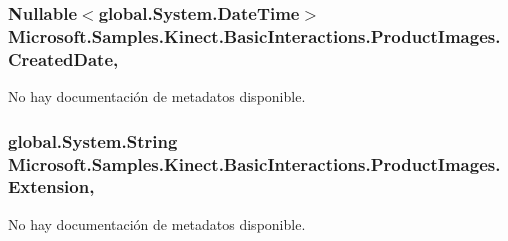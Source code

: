 \hypertarget{class_microsoft_1_1_samples_1_1_kinect_1_1_basic_interactions_1_1_product_images_a3289216b263b856ebdd7d63896f7768c}{
\subsubsection[{Created\-Date}]{\setlength{\rightskip}{0pt plus 5cm}Nullable$<$global.\-System.\-Date\-Time$>$ Microsoft.\-Samples.\-Kinect.\-Basic\-Interactions.\-Product\-Images.\-Created\-Date\hspace{0.3cm}{\ttfamily [get]}, {\ttfamily [set]}}}\label{class_microsoft_1_1_samples_1_1_kinect_1_1_basic_interactions_1_1_product_images_a3289216b263b856ebdd7d63896f7768c}


No hay documentación de metadatos disponible. 

\hypertarget{class_microsoft_1_1_samples_1_1_kinect_1_1_basic_interactions_1_1_product_images_aeb2144fc2add6d286d25b0b75f541dac}{
\subsubsection[{Extension}]{\setlength{\rightskip}{0pt plus 5cm}global.\-System.\-String Microsoft.\-Samples.\-Kinect.\-Basic\-Interactions.\-Product\-Images.\-Extension\hspace{0.3cm}{\ttfamily [get]}, {\ttfamily [set]}}}\label{class_microsoft_1_1_samples_1_1_kinect_1_1_basic_interactions_1_1_product_images_aeb2144fc2add6d286d25b0b75f541dac}


No hay documentación de metadatos disponible. 

